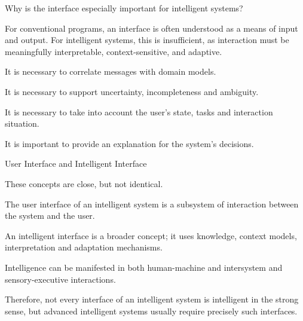 \begin{frame}{Why is the interface especially important for intelligent systems?}
	\topline
	\justifying
	
	
	For conventional programs, an interface is often understood as a means of input and output. For intelligent systems, this is insufficient, as interaction must be meaningfully interpretable, context-sensitive, and adaptive.
	
	\begin{textitemize}
		\item It is necessary to correlate messages with domain models.
		\item It is necessary to support uncertainty, incompleteness and ambiguity.
		\item It is necessary to take into account the user's state, tasks and interaction situation.
		\item It is important to provide an explanation for the system's decisions.
	\end{textitemize}
\end{frame}

\begin{frame}{User Interface and Intelligent Interface}
	\topline
	\justifying
	
	These concepts are close, but not identical.
	
	\begin{textitemize}
		\item The user interface of an intelligent system is a subsystem of interaction between the system and the user.
		\item An intelligent interface is a broader concept; it uses knowledge, context models, interpretation and adaptation mechanisms.
		\item Intelligence can be manifested in both human-machine and intersystem and sensory-executive interactions.
		\item Therefore, not every interface of an intelligent system is intelligent in the strong sense, but advanced intelligent systems usually require precisely such interfaces.
	\end{textitemize}
\end{frame}

